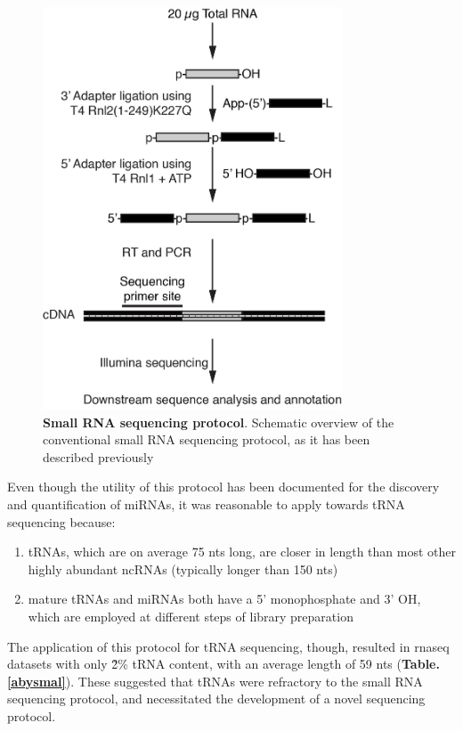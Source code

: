 \documentclass[12pt]{rockefeller}
\begin{document}
\begin{figure}[!ht]%
\centering
\includegraphics[width=3.5in]{sRNA.png}%
\caption[Small RNA sequencing protocol]{\textbf{Small RNA sequencing protocol}. Schematic overview of the conventional small RNA sequencing protocol, as it has been described previously \cite{Hafner:2012eaa}} 
\centering
\label{sRNA}%
\end{figure}

Even though the utility of this protocol has been documented for the discovery and quantification of miRNAs, it was reasonable to apply towards tRNA sequencing because:
\begin{enumerate}
\item tRNAs, which are on average 75 \glspl{nt} long, are closer in length than most other highly abundant ncRNAs (typically longer than 150 nts) 
\item mature tRNAs and miRNAs both have a 5' monophosphate and 3' OH, which are employed at different steps of library preparation
\end{enumerate}

The application of this protocol for tRNA sequencing, though, resulted in \gls{rnaseq} datasets with only \~2\% tRNA content, with an average length of 59 nts (\textbf{Table. \ref{abysmal}}). These suggested that tRNAs were refractory to the small RNA sequencing protocol, and necessitated the development of a novel sequencing protocol. 
\end{document}
